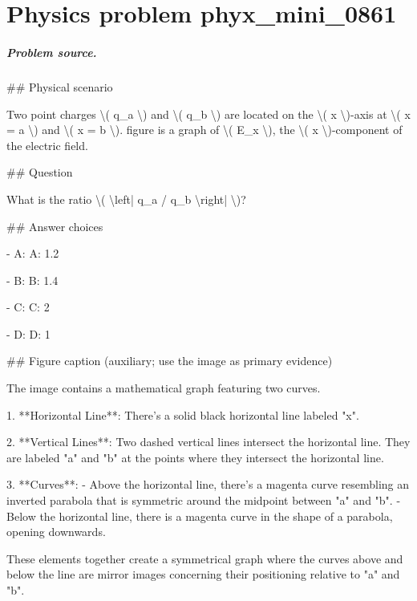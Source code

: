 
\chapter{Physics problem phyx\_mini\_0861}
\label{ch:PhyXMiniProblems_problem_phyx_mini_0861}

\paragraph{Problem source.}
\#\# Physical scenario

Two point charges \textbackslash{}( q\_a \textbackslash{}) and \textbackslash{}( q\_b \textbackslash{}) are located on the \textbackslash{}( x \textbackslash{})-axis at \textbackslash{}( x = a \textbackslash{}) and \textbackslash{}( x = b \textbackslash{}). figure is a graph of \textbackslash{}( E\_x \textbackslash{}), the \textbackslash{}( x \textbackslash{})-component of the electric field.

\#\# Question

What is the ratio \textbackslash{}( \textbackslash{}left| q\_a / q\_b \textbackslash{}right| \textbackslash{})?

\#\# Answer choices

- A: A: 1.2

- B: B: 1.4

- C: C: 2

- D: D: 1

\#\# Figure caption (auxiliary; use the image as primary evidence)

The image contains a mathematical graph featuring two curves. 

1. **Horizontal Line**: There's a solid black horizontal line labeled "x". 

2. **Vertical Lines**: Two dashed vertical lines intersect the horizontal line. They are labeled "a" and "b" at the points where they intersect the horizontal line.

3. **Curves**: 
   - Above the horizontal line, there's a magenta curve resembling an inverted parabola that is symmetric around the midpoint between "a" and "b".
   - Below the horizontal line, there is a magenta curve in the shape of a parabola, opening downwards.

These elements together create a symmetrical graph where the curves above and below the line are mirror images concerning their positioning relative to "a" and "b".

